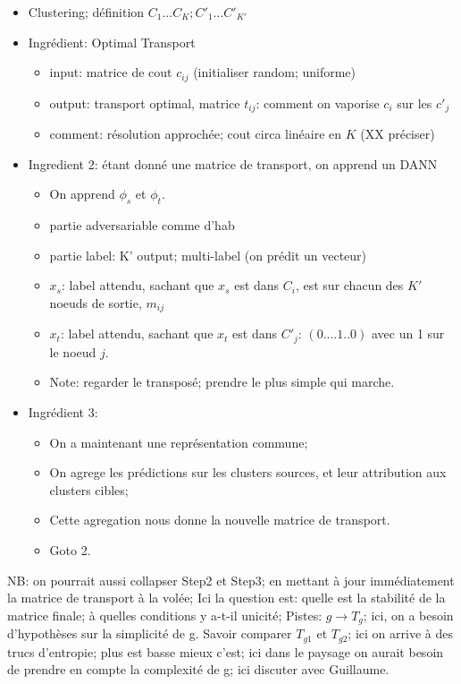 \begin{itemize}
\item Clustering; définition $C_1...C_K; C'_1...C'_{K'}$
\item Ingrédient: Optimal Transport
\begin{itemize}
\item input: matrice de cout $c_{ij}$ (initialiser random; uniforme)
\item output: transport optimal, matrice $t_{ij}$: comment on vaporise $c_i$ sur les $c'_j$ 
\item comment: résolution approchée; cout circa linéaire en $K$ (XX préciser)
\end{itemize}
\item Ingredient 2: étant donné une matrice de transport, on apprend un DANN
\begin{itemize}
\item On apprend $\phi_s$ et $\phi_t$.
\item partie adversariable comme d'hab
\item partie label: K' output; multi-label (on prédit un vecteur)
\item $x_s$: label attendu, sachant que $x_s$ est dans $C_i$, est sur chacun des $K'$ noeuds de sortie, $m_{ij}$
\item $x_t$: label attendu, sachant que $x_t$ est dans $C'_j$: $(0....1..0)$ avec un 1 sur le noeud $j$.
\item Note: regarder le transposé; prendre le plus simple qui marche.
\end{itemize}
\item Ingrédient 3: 
\begin{itemize}
\item On a maintenant une représentation commune; 
\item On agrege les prédictions sur les clusters sources, et leur attribution aux clusters cibles;
\item Cette agregation nous donne la nouvelle matrice de transport.
\item Goto 2.
\end{itemize}
\end{itemize}
NB: on pourrait aussi collapser Step2 et Step3; en mettant à jour immédiatement la matrice de transport à la volée; 
Ici la question est: quelle est la stabilité de la matrice finale; à quelles conditions y a-t-il unicité; 
Pistes: $g \to T_g$; ici, on a besoin d'hypothèses sur la simplicité de g.
Savoir comparer $T_{g1}$ et $T_{g2}$; ici on arrive à des trucs d'entropie; plus est basse mieux c'est; 
ici dans le paysage on aurait besoin de prendre en compte la complexité de g; ici discuter avec Guillaume.

